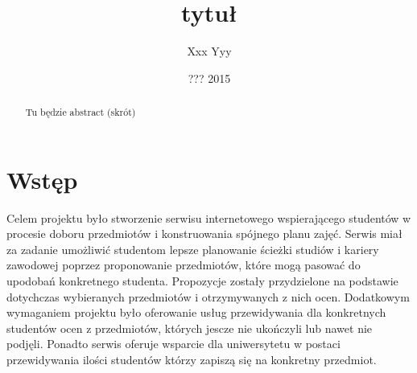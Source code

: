 \documentclass[licencjacka]{pracamgr}
\author{Xxx Yyy}
\title{tytuł}
\date{??? 2015}
\begin{document}
\maketitle
\begin{abstract}
Tu będzie abstract (skrót)
\end{abstract}
\tableofcontents
\chapter*{Wstęp}

Celem projektu było stworzenie serwisu internetowego 
wspierającego studentów w procesie doboru przedmiotów
i konstruowania spójnego planu zajęć.
Serwis miał za zadanie 
umożliwić studentom lepsze planowanie ścieżki studiów i kariery zawodowej
poprzez proponowanie przedmiotów, które mogą pasować do upodobań konkretnego studenta.
Propozycje zostały przydzielone na podstawie dotychczas wybieranych przedmiotów i otrzymywanych z nich ocen.
Dodatkowym wymaganiem projektu było oferowanie usług przewidywania dla konkretnych studentów ocen z przedmiotów, których jescze nie ukończyli lub nawet nie podjęli.
Ponadto serwis oferuje wsparcie dla uniwersytetu w postaci
przewidywania ilości studentów którzy zapiszą się na konkretny przedmiot.
 
\end{document}
